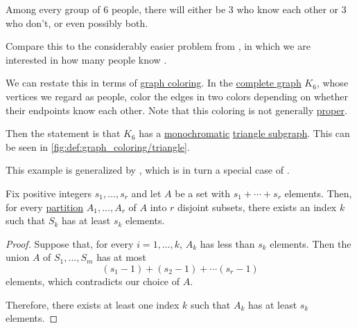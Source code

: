 \begin{example}\label{ex:ramsey_party_problem}
  Among every group of \( 6 \) people, there will either be \( 3 \) who know each other or \( 3 \) who don't, or even possibly both.

  Compare this to the considerably easier problem from , in which we are interested in how many people know .

  We can restate this in terms of \hyperref[def:graph_coloring]{graph coloring}. In the \hyperref[def:complete_graph]{complete graph} \( K_6 \), whose vertices we regard as people, color the edges in two colors depending on whether their endpoints know each other. Note that this coloring is not generally \hyperref[def:graph_coloring/proper]{proper}.

  Then the statement is that \( K_6 \) has a \hyperref[def:set_coloring/monochromatic]{monochromatic} \hyperref[def:triangle_graph]{triangle subgraph}. This can be seen in \cref{fig:def:graph_coloring/triangle}.

  This example is generalized by , which is in turn a special case of .
\end{example}

\begin{lemma}\label{thm:ramsey_number_lemma}
  Fix positive integers \( s_1, \ldots, s_r \) and let \( A \) be a set with \( s_1 + \cdots + s_r \) elements. Then, for every \hyperref[def:set_partition]{partition} \( A_1, \ldots, A_r \) of \( A \) into \( r \) disjoint subsets, there exists an index \( k \) such that \( S_k \) has at least \( s_k \) elements.
\end{lemma}
\begin{proof}
  Suppose that, for every \( i = 1, \ldots, k \), \( A_k \) has less than \( s_k \) elements. Then the union \( A \) of \( S_1, \ldots, S_m \) has at most
  \begin{equation*}
    (s_1 - 1) + (s_2 - 1) + \cdots (s_r - 1)
  \end{equation*}
  elements, which contradicts our choice of \( A \).

  Therefore, there exists at least one index \( k \) such that \( A_k \) has at least \( s_k \) elements.
\end{proof}

